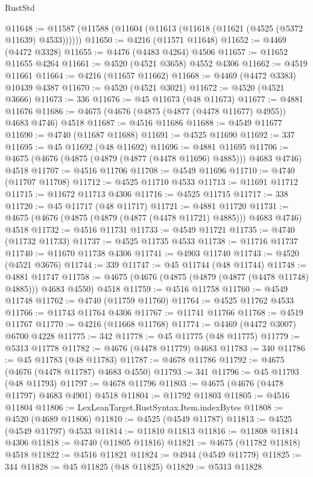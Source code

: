 \begin{lexlean}{RustStd}
\begin{coremodule}
{\begin{coremodule}
{{{{{{{{{{{{{{{{{{{{{{{{{{{{{{{{{{{{{{{{{{{{{{{{{{{{{{{{{{{{@11648 := @11587 (@11588 (@11604 (@11613 (@11618 (@11621 (@4525 (@5372 @11639) @4533))))))
@11650 := @4216 (@11571 @11648)
@11652 := @4469 (@4472 @3328)
@11655 := @4476 (@4483 @4264) @4506
@11657 := @11652 @11655 @4264
@11661 := @4520 (@4521 @3658) @4552 @4306
@11662 := @4519 @11661
@11664 := @4216 (@11657 @11662)
@11668 := @4469 (@4472 @3383) @10439 @4387
@11670 := @4520 (@4521 @3021)
@11672 := @4520 (@4521 @3666)
@11673 := 336
@11676 := @45 @11673 (@48 @11673)
@11677 := @4881 @11676
@11686 := @4675 (@4676 (@4875 (@4877 (@4478 @11677) @4955)) @4683 @4746) @4518
@11687 := @4516 @11686
@11688 := @4549 @11677
@11690 := @4740 (@11687 @11688)
@11691 := @4525 @11690
@11692 := 337
@11695 := @45 @11692 (@48 @11692)
@11696 := @4881 @11695
@11706 := @4675 (@4676 (@4875 (@4879 (@4877 (@4478 @11696) @4885))) @4683 @4746) @4518
@11707 := @4516 @11706
@11708 := @4549 @11696
@11710 := @4740 (@11707 @11708)
@11712 := @4525 @11710 @4533
@11713 := @11691 @11712
@11715 := @11672 @11713 @4306
@11716 := @4525 @11715
@11717 := 338
@11720 := @45 @11717 (@48 @11717)
@11721 := @4881 @11720
@11731 := @4675 (@4676 (@4875 (@4879 (@4877 (@4478 @11721) @4885))) @4683 @4746) @4518
@11732 := @4516 @11731
@11733 := @4549 @11721
@11735 := @4740 (@11732 @11733)
@11737 := @4525 @11735 @4533
@11738 := @11716 @11737
@11740 := @11670 @11738 @4306
@11741 := @4903 @11740
@11743 := @4520 (@4521 @3676)
@11744 := 339
@11747 := @45 @11744 (@48 @11744)
@11748 := @4881 @11747
@11758 := @4675 (@4676 (@4875 (@4879 (@4877 (@4478 @11748) @4885))) @4683 @4550) @4518
@11759 := @4516 @11758
@11760 := @4549 @11748
@11762 := @4740 (@11759 @11760)
@11764 := @4525 @11762 @4533
@11766 := @11743 @11764 @4306
@11767 := @11741 @11766
@11768 := @4519 @11767
@11770 := @4216 (@11668 @11768)
@11774 := @4469 (@4472 @3007) @6700 @4228
@11775 := 342
@11778 := @45 @11775 (@48 @11775)
@11779 := @5313 @11778
@11782 := @4676 (@4478 @11779) @4683
@11783 := 340
@11786 := @45 @11783 (@48 @11783)
@11787 := @4678 @11786
@11792 := @4675 (@4676 (@4478 @11787) @4683 @4550)
@11793 := 341
@11796 := @45 @11793 (@48 @11793)
@11797 := @4678 @11796
@11803 := @4675 (@4676 (@4478 @11797) @4683 @4901) @4518
@11804 := @11792 @11803
@11805 := @4516 @11804
@11806 := LexLeanTarget.RustSyntax.Item.indexBytes
@11808 := @4520 (@4689 @11806)
@11810 := @4525 (@4549 @11787)
@11813 := @4525 (@4549 @11797) @4533
@11814 := @11810 @11813
@11816 := @11808 @11814 @4306
@11818 := @4740 (@11805 @11816)
@11821 := @4675 (@11782 @11818) @4518
@11822 := @4516 @11821
@11824 := @4944 (@4549 @11779)
@11825 := 344
@11828 := @45 @11825 (@48 @11825)
@11829 := @5313 @11828
}}}}}}}}}}}}}}}}}}}}}}}}}}}}}}}}}}}}}}}}}}}}}}}}}}}}}}}}}}}}
\end{coremodule}}
\end{coremodule}
\end{lexlean}
